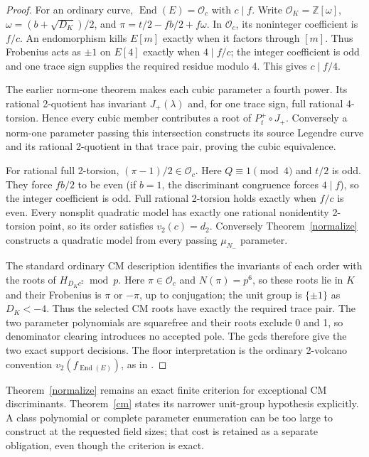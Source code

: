 \documentclass[11pt]{article}
\newcommand{\OO}{\mathcal O}
\newcommand{\Nm}{N_-}
\begin{document}
\begin{proof}
For an ordinary curve, $\operatorname{End}(E)=\OO_c$ with $c\mid f$.
Write $\OO_K=\mathbb Z[\omega]$, $\omega=(b+\sqrt{D_K})/2$, and
$\pi=t/2-fb/2+f\omega$. In $\OO_c$, its noninteger coefficient is $f/c$.
An endomorphism kills $E[m]$ exactly when it factors through $[m]$.
Thus Frobenius acts as $\pm1$ on $E[4]$ exactly when $4\mid f/c$;
the integer coefficient is odd and one trace sign supplies the required
residue modulo 4. This gives $c\mid f/4$.

The earlier norm-one theorem makes each cubic parameter a fourth power.
Its rational 2-quotient has invariant $J_+(\lambda)$ and, for one trace
sign, full rational 4-torsion. Hence every cubic member contributes a root of
$P_t^+\circ J_+$. Conversely a norm-one parameter passing this intersection
constructs its source Legendre curve and its rational 2-quotient in that
trace pair, proving the cubic equivalence.

For rational full 2-torsion, $(\pi-1)/2\in\OO_c$.
Here $Q\equiv1\pmod4$ and $t/2$ is odd. They force $fb/2$ to be even
(if $b=1$, the discriminant congruence forces $4\mid f$), so the integer
coefficient is odd. Full rational 2-torsion holds exactly when $f/c$ is even.
Every nonsplit quadratic model has exactly one rational nonidentity
2-torsion point, so its order satisfies $v_2(c)=d_2$.
Conversely Theorem~\ref{normalize} constructs a quadratic model from every
passing $\mu_{\Nm}$ parameter.

The standard ordinary CM description identifies the invariants of each
order with the roots of $H_{D_Kc^2}\bmod p$. Here $\pi\in\OO_c$ and
$N(\pi)=p^6$, so these roots lie in $K$ and their Frobenius is $\pi$ or
$-\pi$, up to conjugation; the unit group is $\{\pm1\}$ as $D_K<-4$.
Thus the selected CM roots have exactly the required trace pair.
The two parameter polynomials are squarefree and their roots exclude 0 and 1,
so denominator clearing introduces no accepted pole. The gcds therefore give
the two exact support decisions. The floor interpretation is the ordinary
2-volcano convention $v_2(f_{\operatorname{End}(E)})$, as in \cite{Suth}.
\end{proof}

Theorem~\ref{normalize} remains an exact finite criterion for exceptional
CM discriminants. Theorem~\ref{cm} states its narrower unit-group hypothesis
explicitly. A class polynomial or complete parameter enumeration can be too
large to construct at the requested field sizes; that cost is retained as a
separate obligation, even though the criterion is exact.
\end{document}
